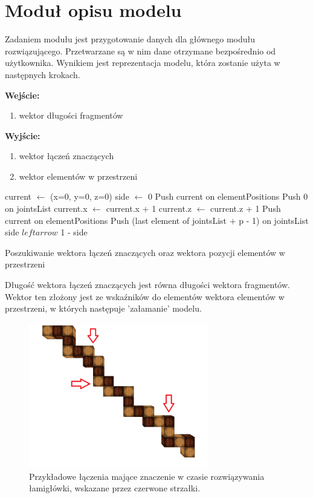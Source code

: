 \section{Moduł opisu modelu}
Zadaniem modułu jest przygotowanie danych dla głównego modułu rozwiązującego. Przetwarzane są w nim dane otrzymane bezpośrednio od użytkownika. Wynikiem jest reprezentacja modelu, która zostanie użyta w następnych krokach.

\textbf{Wejście:}
\begin{enumerate}
\item wektor długości fragmentów
\end{enumerate}

\textbf{Wyjście:}
\begin{enumerate}
\item wektor łączeń znaczących
\item wektor elementów w przestrzeni
\end{enumerate}

{\small
	\begin{pseudokod}[H]
    current $\leftarrow$ (x=0, y=0, z=0)\;
    side $\leftarrow$ 0\;
    Push current on elementPositions\;
    Push 0 on jointsList\;
    {
        {
            {
                current.x $\leftarrow$ current.x + 1\;
            }
            {
                current.z $\leftarrow$ current.z + 1\;
            }
			Push current on elementPositions\;
        }
		Push (last element of jointsList + p - 1) on jointsList\;
        side $leftarrow$ 1 - side\;
    }
	\caption{Poszukiwanie wektora łączeń znaczących oraz wektora pozycji elementów w przestrzeni}
	\label{alg:mine3}
	\end{pseudokod}
}

Długość wektora łączeń znaczących jest równa długości wektora fragmentów. Wektor ten złożony jest ze wskaźników do elementów wektora elementów w przestrzeni, w których następuje 'załamanie' modelu.

\begin{figure}[h]
    \centering
    \includegraphics[width=0.7\textwidth]{joints}
    \caption{Przykładowe łączenia mające znaczenie w czasie rozwiązywania łamigłówki, wskazane przez czerwone strzałki.}
    \label{fig:joints1}
\end{figure}

